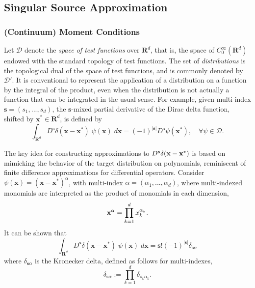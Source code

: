 \subsection{Singular Source Approximation}



\subsubsection{(Continuum) Moment Conditions}

%

Let $\mathcal D$ denote the {\em space of test functions} over $\mathbf R^d$, that is, the space of $C^\infty_0(\mathbf R^d)$ endowed with the standard topology of test functions.
The set of \emph{distributions} is the topological dual of the space
of test functions, and is commonly denoted by $\mathcal D'$.
It is conventional to represent the application of a distribution on a function by the integral of the product, even when the distribution is not actually a function that can be integrated in the usual sense.
For example, given multi-index $\mathbf s=(s_1,...,s_d)$, the $\mathbf s$-mixed partial derivative of the Dirac delta function, shifted by $\mathbf x^*\in\mathbf R^d$, is defined by
\[
	\int_{\mathbf R^d} D^{\mathbf s} \delta(\mathbf x-\mathbf x^*) \; \psi(\mathbf x)\; d\mathbf x =
	(-1)^{|\mathbf s|} D^{\mathbf s} \psi(\mathbf x^*), \quad \forall \psi \in\mathcal D.
\]

%
The key idea for constructing approximations to $D^{\bf s}\delta(\mathbf x-\mathbf x^*)$ is based on mimicking the behavior of the target distribution on polynomials, reminiscent of finite difference approximations for differential operators.
Consider $\psi(\mathbf x) = (\mathbf x - \mathbf x^*)^{\alpha}$, with multi-index $\alpha=(\alpha_1,...,\alpha_d)$, where multi-indexed monomials are interpreted as the product of monomials in each dimension,
\[
       {\bf x}^{\alpha} = \prod_{k=1}^d x_k^{\alpha_k}.
\] 
It can be shown that
\[
	\int_{\mathbf R^d} D^{\mathbf s}\delta(\mathbf x-\mathbf x^*)\; \psi(\mathbf x) \; d\mathbf x = \mathbf s! (-1)^{|\mathbf s|} \delta_{\mathbf s \alpha}
\]
where $\delta_{\mathbf s \alpha}$ is the Kronecker delta, defined as follows for multi-indexes,
\[
	\delta_{\mathbf s \alpha} := \prod_{k=1}^d \delta_{s_k \alpha_k}.
\]

